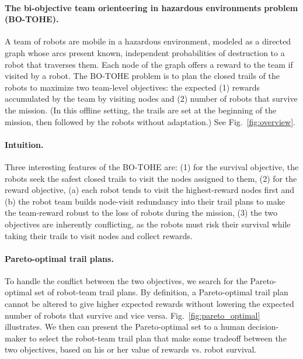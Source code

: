 \documentclass[11pt, oneside]{article}
\begin{document}
\paragraph{The bi-objective team orienteering in hazardous environments problem (BO-TOHE).} 
A team of robots are mobile in a hazardous environment, modeled as a directed graph whose arcs present known, independent probabilities of destruction to a robot that traverses them.
Each node of the graph offers a reward to the team if visited by a robot.
The BO-TOHE problem is to plan the closed trails of the robots to maximize two team-level objectives: the expected
(1) rewards accumulated by the team by visiting nodes and
(2) number of robots that survive the mission. 
(In this offline setting, the trails are set at the beginning of the mission, then followed by the robots without adaptation.)
See Fig.~\ref{fig:overview}.

\paragraph{Intuition.} Three interesting features of the BO-TOHE are: 
(1) for the survival objective, the robots seek the safest closed trails to visit the nodes assigned to them,
(2) for the reward objective, (a) each robot tends to visit the highest-reward nodes first and (b) the robot team builds node-visit redundancy into their trail plans to make the team-reward robust to the loss of robots during the mission,
(3) the two objectives are inherently conflicting, as the robots must risk their survival while taking their trails to visit nodes and collect rewards.%

\paragraph{Pareto-optimal trail plans.}
To handle the conflict between the two objectives, we search for the Pareto-optimal set of robot-team trail plans. By definition, a Pareto-optimal trail plan cannot be altered to give higher expected rewards without lowering the expected number of robots that survive and vice versa. 
Fig.~\ref{fig:pareto_optimal} illustrates.
We then can present the Pareto-optimal set to a human decision-maker to select the robot-team trail plan that make some tradeoff between the two objectives, based on his or her value of rewards vs. robot survival. 
\end{document}

